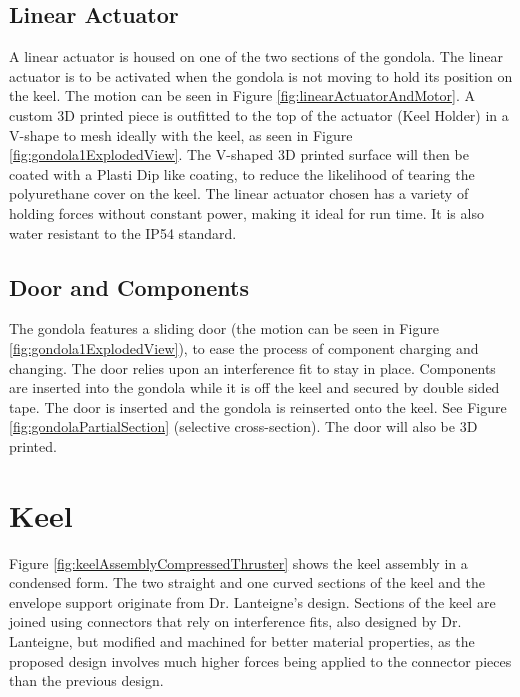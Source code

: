 \documentclass[../main.tex]{subfiles}
\begin{document}
\subsection{Linear Actuator}
A linear actuator is housed on one of the two sections of the gondola. The linear actuator is to be activated when the gondola is not moving to hold its position on the keel. The motion can be seen in Figure \ref{fig:linearActuatorAndMotor}. A custom 3D printed piece is outfitted to the top of the actuator (Keel Holder) in a V-shape to mesh ideally with the keel, as seen in Figure \ref{fig:gondola1ExplodedView}. The V-shaped 3D printed surface will then be coated with a Plasti Dip\textregistered{} like coating, to reduce the likelihood of tearing the polyurethane cover on the keel.  The  linear actuator chosen has a variety of holding forces without constant power, making it ideal for run time. It is also water resistant to the IP54 standard. 
\\
\subsection{Door and Components}
The gondola features a sliding door (the motion can be seen in Figure \ref{fig:gondola1ExplodedView}), to ease the process of component charging and changing. The door relies upon an interference fit to stay in place. Components are inserted into the gondola while it is off the keel and secured by double sided tape. The door is inserted and the gondola is reinserted onto the keel. See Figure \ref{fig:gondolaPartialSection} (selective cross-section). The door will also be 3D printed.
\\
\section{Keel}
Figure \ref{fig:keelAssemblyCompressedThruster} shows the keel assembly in a condensed form. The two straight and one curved sections of the keel and the envelope support originate from Dr. Lanteigne's design. Sections of the keel are joined using connectors that rely on interference fits, also designed by Dr. Lanteigne, but modified and machined for better material properties, as the proposed design involves much higher forces being applied to the connector pieces than the previous design. 
\end{document}
